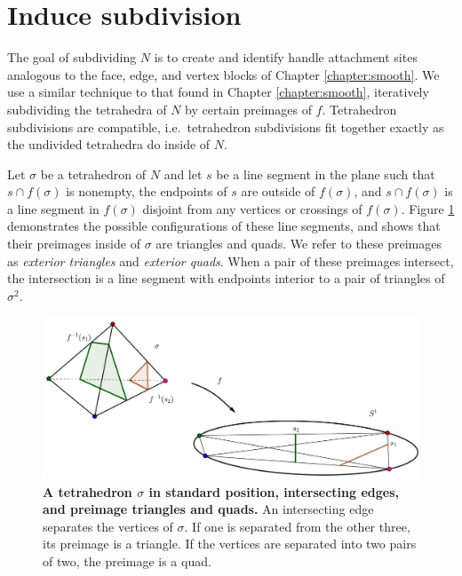 \section{Induce subdivision}
\label{section:pl-subdivide}

The goal of subdividing $N$ is to create and identify handle attachment sites analogous to the face, edge, and vertex blocks of Chapter \ref{chapter:smooth}.
We use a similar technique to that found in Chapter \ref{chapter:smooth}, iteratively subdividing the tetrahedra of $N$ by certain preimages of $f$.
Tetrahedron subdivisions are compatible, i.e.\ tetrahedron subdivisions fit together exactly as the undivided tetrahedra do inside of $N$.

Let $\sigma$ be a tetrahedron of $N$ and let $s$ be a line segment in the plane such that $s\cap f(\sigma)$ is nonempty, the endpoints of $s$ are outside of $f(\sigma)$,  and $s\cap f(\sigma)$ is a line segment in $f(\sigma)$ disjoint from any vertices or crossings of $f(\sigma)$.
Figure \ref{fig:standard-position-intersection} demonstrates the possible configurations of these line segments, and shows that their preimages inside of $\sigma$ are triangles and quads.
We refer to these preimages as \emph{exterior triangles} and \emph{exterior quads}.
When a pair of these preimages intersect, the intersection is a line segment with endpoints interior to a pair of triangles of $\sigma^2$.

\begin{figure}[h!]
	\centering
	\includegraphics[width=\textwidth]{figures/standard-position-intersection.png}
	\caption{
		\textbf{A tetrahedron $\sigma$ in standard position, intersecting edges, and preimage triangles and quads.}
		An intersecting edge separates the vertices of $\sigma$.
		If one is separated from the other three, its preimage is a triangle.
		If the vertices are separated into two pairs of two, the preimage is a quad.
	}
	\label{fig:standard-position-intersection}
\end{figure}

